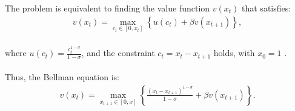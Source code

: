 \documentclass[12pt]{extarticle}
\begin{document}
The problem is equivalent to finding the value function $v(x_t)$ that satisfies:
\begin{align}
    v(x_t) = \max_{c_t \in [0, x_t]} \left\{ u(c_t) + \beta v(x_{t+1}) \right\}, \label{equation:dp_3}
\end{align}\\
where $u(c_t) = \frac{c_t^{1-\sigma}}{1-\sigma}$, and the constraint $c_t = x_t - x_{t+1}$ holds, with $x_0 = 1$ .\\\\
Thus, the Bellman equation is:
\begin{align}
    v(x_t) = \max_{x_{t+1} \in [0, x]} \left\{ \frac{(x_t - x_{t+1})^{1-\sigma}}{1-\sigma} + \beta v(x_{t+1}) \right\}. \label{equation:dp_4}
\end{align}\\
\end{document}
